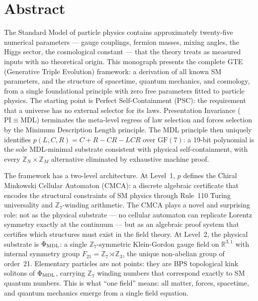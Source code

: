 \documentclass[11pt,openany]{book}
\theoremstyle{remark}
\begin{document}
\chapter*{Abstract}

The Standard Model of particle physics contains approximately twenty-five numerical
parameters --- gauge couplings, fermion masses, mixing angles, the Higgs sector, the
cosmological constant --- that the theory treats as measured inputs with no theoretical
origin. This monograph presents the complete GTE (Generative Triple Evolution) framework:
a derivation of all known SM parameters, and the structure of spacetime, quantum
mechanics, and cosmology, from a single foundational principle with zero free parameters
fitted to particle physics. The starting point is Perfect Self-Containment (PSC): the
requirement that a universe has no external selector for its laws. Presentation
Invariance ($\mathrm{PI}\equiv\mathrm{MDL}$) terminates the meta-level regress of law
selection and forces selection by the Minimum Description Length principle. The MDL
principle then uniquely identifies $p(L,C,R) =
C+R-CR-LCR$ over $\mathrm{GF}(7)$: a 19-bit polynomial is the sole MDL-minimal
substrate consistent with physical self-containment, with every $\mathbb{Z}_N \times
\mathbb{Z}_M$ alternative eliminated by exhaustive machine proof.

The framework has a two-level architecture. At Level~1, $p$ defines the Chiral
Minkowski Cellular Automaton (CMCA): a discrete algebraic certificate that encodes the
structural constraints of SM physics through Rule~110 Turing universality and
$\mathbb{Z}_7$-winding arithmetic. The CMCA plays a novel and surprising role: not as
the physical substrate --- no cellular automaton can replicate Lorentz symmetry exactly
at the continuum --- but as an algebraic proof system that certifies which structures
must exist in the field theory. At Level~2, the physical substrate is $\Phi_{\rm MDL}$:
a single $\mathbb{Z}_7$-symmetric Klein-Gordon gauge field on $\mathbb{R}^{3,1}$ with
internal symmetry group $F_{21} = \mathbb{Z}_7\rtimes\mathbb{Z}_3$, the unique
non-abelian group of order~21. Elementary particles are not points: they are BPS
topological kink solitons of $\Phi_{\rm MDL}$, carrying $\mathbb{Z}_7$ winding numbers
that correspond exactly to SM quantum numbers. This is what ``one field'' means: all
matter, forces, spacetime, and quantum mechanics emerge from a single field equation.
\end{document}
